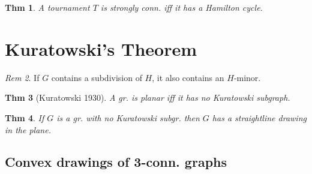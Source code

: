 \documentclass[11pt, fleqn, a4paper, landscape]{article}
\theoremstyle{plain} %
\newtheorem{thm}{Thm}
\theoremstyle{remark} %
\newtheorem{rem}[thm]{Rem}
\theoremstyle{definition} %
\newtheorem{defi}[thm]{Def}
\begin{document}
\begin{multicols}{5}
\addtocounter{thm}{1}
\begin{thm}
A tournament $T$ is strongly conn. iff it has a Hamilton cycle.
\end{thm}

\section{Kuratowski’s Theorem}

\addtocounter{thm}{2}
\begin{rem}
If $G$ contains a subdivision of $H$, it also contains an $H$-minor.
\end{rem}

\addtocounter{thm}{1}
\begin{thm}[Kuratowski 1930]
A gr. is planar iff it has no Kuratowski subgraph.
\end{thm}

\addtocounter{thm}{1}

\begin{thm}
If $G$ is a gr. with no Kuratowski subgr. then $G$ has a straightline drawing in the plane.
\end{thm}

\subsection{Convex drawings of 3-conn. graphs}

\addtocounter{thm}{1}


\end{multicols}
\end{document}

